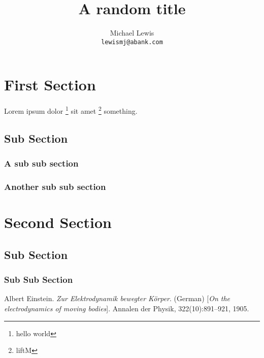 \documentclass[twocolumn]{article}
\title{A random title}
\author{Michael Lewis\\
{\tt\small lewismj@abank.com}
}
\begin{document}
\maketitle

\begin{abstract}
\lipsum[1-1]
\end{abstract}

\tableofcontents
\medskip
\medskip
\section{First Section}
 Lorem ipsum dolor \footnote {hello world} sit amet
 \footnote{liftM} something.
	\lipsum[1-2]
	\subsection{Sub Section}
		\subsubsection{A sub sub section}
			\lipsum[1-1]
	\subsubsection{Another sub sub section}
		\lipsum[1-1]
\section{Second Section}
	\subsection{Sub Section}
		\subsubsection{Sub Sub Section}
			\lipsum[1-5]
			
\begin{thebibliography}{9}

Albert Einstein. 
\textit{Zur Elektrodynamik bewegter K{\"o}rper}. (German) 
[\textit{On the electrodynamics of moving bodies}]. 
Annalen der Physik, 322(10):891–921, 1905.

 \end{thebibliography}
\end{document}
